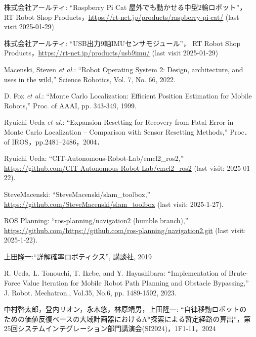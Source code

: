 \documentclass[twocolumn,9pt]{jsproceedings}
\begin{document}
\footnotesize
\begin{thebibliography}{99}

  株式会社アールティ: ``Raspberry Pi Cat 屋外でも動かせる中型2輪ロボット''，
  RT Robot Shop Products，\url{https://rt-net.jp/products/raspberry-pi-cat/} (last visit 2025-01-29)
  
  株式会社アールティ: ``USB出力9軸IMUセンサモジュール''，
  RT Robot Shop Products，\url{https://rt-net.jp/products/usb9imu/} (last visit 2025-01-29)

  Macenski, Steven {\it et al.}: ``Robot Operating System 2: Design, architecture, and uses in the wild,''
  Science Robotics, Vol. 7, No. 66, 2022.

	  D. Fox {\it et al.}: ``Monte Carlo Localization: Efficient Position Estimation for Mobile Robots,''
  Proc. of AAAI, pp. 343-349, 1999.

  Ryuichi Ueda {\it et al.}: 
  ``Expansion Resetting for Recovery from Fatal Error in Monte Carlo Localization -- Comparison with Sensor Resetting Methods,'' Proc．of IROS，pp.2481--2486，2004．

  Ryuichi Ueda: ``CIT-Autonomous-Robot-Lab/emcl2\_ros2,'' \url{https://github.com/CIT-Autonomous-Robot-Lab/emcl2_ros2} (last visit: 2025-01-22).
  
  SteveMacenski: ``SteveMacenski/slam\_toolbox,'' \url{https://github.com/SteveMacenski/slam_toolbox} (last visit: 2025-1-27).

  ROS Planning: ``ros-planning/navigation2 (humble branch),'' \url{https://github.com/https://github.com/ros-planning/navigation2.git} (last visit: 2025-1-22).

    上田隆一:``詳解確率ロボティクス'', 講談社, 2019

  R. Ueda, L. Tonouchi, T. Ikebe, and Y. Hayashibara: ``Implementation of Brute-Force Value Iteration for Mobile Robot Path Planning and Obstacle Bypassing,''
  J. Robot. Mechatron., Vol.35, No.6, pp. 1489-1502, 2023.

    中村啓太郎，登内リオン，永木悠，林原靖男，上田隆一: ``自律移動ロボットのための価値反復ベースの大域計画器におけるA*探索による暫定経路の算出''，第25回システムインテグレーション部門講演会(SI2024)，1F1-11，2024


\end{thebibliography}
\end{document}
